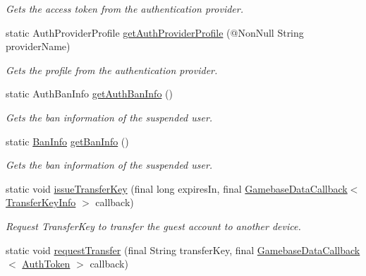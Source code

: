 \begin{DoxyCompactItemize}
\begin{DoxyCompactList}\small\item\em Gets the access token from the authentication provider. \end{DoxyCompactList}\item 
static Auth\+Provider\+Profile \hyperlink{classcom_1_1toast_1_1android_1_1gamebase_1_1_gamebase_abfa260ed922444ef35f23f8ac847b4f8}{get\+Auth\+Provider\+Profile} (@Non\+Null String provider\+Name)
\begin{DoxyCompactList}\small\item\em Gets the profile from the authentication provider. \end{DoxyCompactList}\item 
static Auth\+Ban\+Info \hyperlink{classcom_1_1toast_1_1android_1_1gamebase_1_1_gamebase_ad2da4e502aade3b2c9434fc1470e3425}{get\+Auth\+Ban\+Info} ()
\begin{DoxyCompactList}\small\item\em Gets the ban information of the suspended user. \end{DoxyCompactList}\item 
static \hyperlink{classcom_1_1toast_1_1android_1_1gamebase_1_1auth_1_1data_1_1_ban_info}{Ban\+Info} \hyperlink{classcom_1_1toast_1_1android_1_1gamebase_1_1_gamebase_a61447d8f3f3a655ea83649465da9df62}{get\+Ban\+Info} ()
\begin{DoxyCompactList}\small\item\em Gets the ban information of the suspended user. \end{DoxyCompactList}\item 
static void \hyperlink{classcom_1_1toast_1_1android_1_1gamebase_1_1_gamebase_a08e4f03faeb1b5f1e200baaf2ce8f9a2}{issue\+Transfer\+Key} (final long expires\+In, final \hyperlink{interfacecom_1_1toast_1_1android_1_1gamebase_1_1_gamebase_data_callback}{Gamebase\+Data\+Callback}$<$ \hyperlink{classcom_1_1toast_1_1android_1_1gamebase_1_1auth_1_1data_1_1_transfer_key_info}{Transfer\+Key\+Info} $>$ callback)
\begin{DoxyCompactList}\small\item\em Request Transfer\+Key to transfer the guest account to another device. \end{DoxyCompactList}\item 
static void \hyperlink{classcom_1_1toast_1_1android_1_1gamebase_1_1_gamebase_a497299e85574df22a08a7daf1f032ff3}{request\+Transfer} (final String transfer\+Key, final \hyperlink{interfacecom_1_1toast_1_1android_1_1gamebase_1_1_gamebase_data_callback}{Gamebase\+Data\+Callback}$<$ \hyperlink{classcom_1_1toast_1_1android_1_1gamebase_1_1auth_1_1data_1_1_auth_token}{Auth\+Token} $>$ callback)

\end{DoxyCompactItemize}
